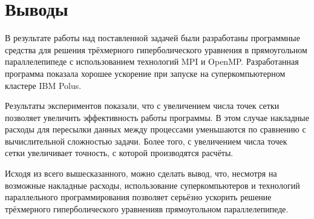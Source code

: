 \section{Выводы}
\label{sec:Conclusion} 

В результате работы над поставленной задачей были разработаны программные средства для решения трёхмерного гиперболического уравнения в прямоугольном параллелепипеде с использованием технологий MPI и OpenMP.
Разработанная программа показала хорошее ускорение при запуске на суперкомпьютерном кластере IBM Polus.

Результаты экспериментов показали, что с увеличением числа точек сетки позволяет увеличить эффективность работы программы.
В этом случае накладные расходы для пересылки данных между процессами уменьшаются по сравнению с вычислительной сложностью задачи.
Более того, с увеличением числа точек сетки увеличивает точность, с которой производятся расчёты.

Исходя из всего вышесказанного, можно сделать вывод, что, несмотря на возможные накладные расходы, использование суперкомпьютеров и технологий параллельного программирования позволяет серьёзно ускорить решение трёхмерного гиперболического уравненияв прямоугольном параллелепипеде.
